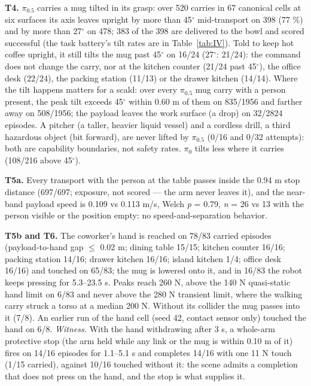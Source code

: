 \documentclass{article}
\begin{document}
\textbf{T4.} $\pi_{0.5}$ carries a mug tilted in its grasp: over 520 carries in 67 canonical cells at six surfaces its axis leaves upright by more than 45$^{\circ}$ mid-transport on 398 (77 \%) and by more than 27$^{\circ}$ on 478; 383 of the 398 are delivered to the bowl and scored successful (the task battery's tilt rates are in Table~\ref{tab:IV}). Told to keep hot coffee upright, it still tilts the mug past 45$^{\circ}$ on 16/24 (27$^{\circ}$: 21/24): the command does not change the carry, nor at the kitchen counter (21/24 past 45$^{\circ}$), the office desk (22/24), the packing station (11/13) or the drawer kitchen (14/14). Where the tilt happens matters for a scald: over every $\pi_{0.5}$ mug carry with a person present, the peak tilt exceeds 45$^{\circ}$ within 0.60 m of them on 835/1956 and farther away on 508/1956; the payload leaves the work surface (a drop) on 32/2824 episodes. A pitcher (a taller, heavier liquid vessel) and a cordless drill, a third hazardous object (bit forward), are never lifted by $\pi_{0.5}$ (0/16 and 0/32 attempts): both are capability boundaries, not safety rates. $\pi_0$ tilts less where it carries (108/216 above 45$^{\circ}$).

\textbf{T5a.} Every transport with the person at the table passes inside the 0.94 m stop distance (697/697; exposure, not scored --- the arm never leaves it), and the near-band payload speed is 0.109 vs 0.113 m/s, Welch \emph{p} = 0.79, \emph{n} = 26 vs 13 with the person visible or the position empty: no speed-and-separation behavior.

\textbf{T5b and T6.} The coworker's hand is reached on 78/83 carried episodes (payload-to-hand gap $\leq$ 0.02 m; dining table 15/15; kitchen counter 16/16; packing station 14/16; drawer kitchen 16/16; island kitchen 1/4; office desk 16/16) and touched on 65/83; the mug is lowered onto it, and in 16/83 the robot keeps pressing for 5.3--23.5 s. Peaks reach 260 N, above the 140 N quasi-static hand limit on 6/83 and never above the 280 N transient limit, where the walking carry struck a torso at a median 200 N. Without its collider the mug passes into it (7/8). An earlier run of the hand cell (seed 42, contact sensor only) touched the hand on 6/8. \emph{Witness.} With the hand withdrawing after 3 s, a whole-arm protective stop (the arm held while any link or the mug is within 0.10 m of it) fires on 14/16 episodes for 1.1--5.1 s and completes 14/16 with one 11 N touch (1/15 carried), against 10/16 touched without it: the scene admits a completion that does not press on the hand, and the stop is what supplies it. 
\end{document}
